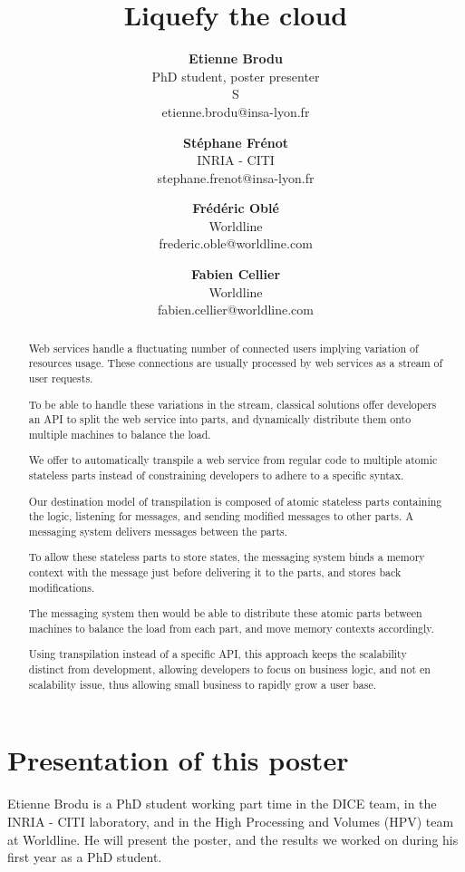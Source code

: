 \documentclass[11pt,twocolumn]{article}
\begin{document}
\begin{multicols}{4}
\title{\textbf{Liquefy the cloud}}
\author{
    \textbf{Etienne Brodu}\\
    PhD student, poster presenter\\
    S\\
    etienne.brodu@insa-lyon.fr
  \and
    \textbf{Stéphane Frénot}\\
    INRIA - CITI\\
    stephane.frenot@insa-lyon.fr
  \and
    \textbf{Frédéric Oblé}\\
    Worldline\\
    frederic.oble@worldline.com
  \and
    \textbf{Fabien Cellier}\\
    Worldline\\
    fabien.cellier@worldline.com
}
\date{}
\maketitle
\end{multicols}

\maketitle

\begin{abstract}
Web services handle a fluctuating number of connected users implying variation of resources usage.
These connections are usually processed by web services as a stream of user requests.

To be able to handle these variations in the stream, classical solutions offer developers an API to split the web service into parts, and dynamically distribute them onto multiple machines to balance the load.

We offer to automatically transpile a web service from regular code to multiple atomic stateless parts instead of constraining developers to adhere to a specific syntax.

Our destination model of transpilation is composed of atomic stateless parts containing the logic, listening for messages, and sending modified messages to other parts.
A messaging system delivers messages between the parts.

To allow these stateless parts to store states, the messaging system binds a memory context with the message just before delivering it to the parts, and stores back modifications.

The messaging system then would be able to distribute these atomic parts between machines to balance the load from each part, and move memory contexts accordingly.

Using transpilation instead of a specific API, this approach keeps the scalability distinct from development, allowing developers to focus on business logic, and not en scalability issue, thus allowing small business to rapidly grow a user base.
\end{abstract}

\section*{Presentation of this poster}
Etienne Brodu is a PhD student working part time in the DICE team, in the INRIA - CITI laboratory, and in the High Processing and Volumes (HPV) team at Worldline.
He will present the poster, and the results we worked on during his first year as a PhD student.
\end{document}
